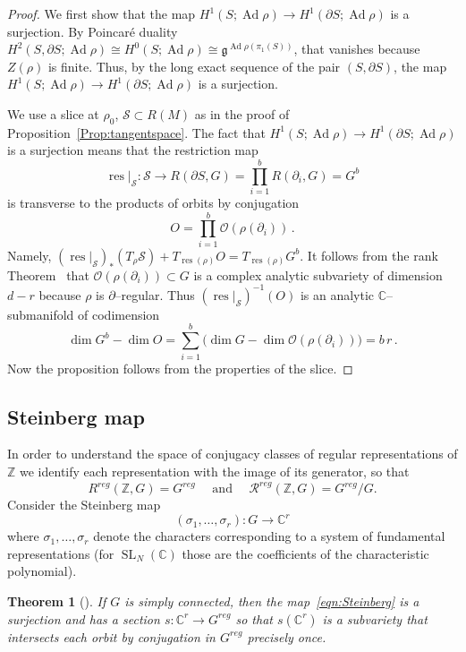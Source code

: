 \documentclass[11pt]{article}
\newtheorem{theo}{Theorem}[section]
\theoremstyle{definition}
\numberwithin{equation}{section}
\numberwithin{figure}{section}
\numberwithin{table}{section}
\DeclareMathOperator{\SL}{SL}
\DeclareMathOperator{\Ad}{Ad}
\DeclareMathOperator{\res}{res}
\newcommand{\Rcal}{\mathcal{R}}
\newcommand{\Ocal}{\mathcal{O}}
\newcommand{\Scal}{\mathcal{S}}
\newcommand{\Cbb}{\mathbb{C}}
\newcommand{\Zbb}{\mathbb{Z}}
\newcommand{\gfrk}{\mathfrak{g}}
\newcommand*\dG{{d}}
\newcommand*\rG{r}
\newcommand*\bS{b}
\begin{document}
\begin{proof}
We first show that the map $H^1(S;\Ad\rho)\to H^1(\partial S;\Ad\rho)$ is a surjection. By Poincaré duality $H^2(S,\partial S;\Ad\rho) \cong H^0(S;\Ad\rho)\cong \gfrk^{\Ad\rho(\pi_1(S))}$, that vanishes because $Z(\rho)$ is finite. Thus, by the long exact sequence of the pair $(S,\partial S)$, the map $H^1(S;\Ad\rho)\to H^1(\partial S;\Ad\rho)$ is a surjection.


We use a slice at $\rho_0$, $\Scal\subset R(M)$ as in the proof of Proposition~\ref{Prop:tangentspace}. The fact that $H^1(S;\Ad\rho)\to H^1(\partial S;\Ad\rho)$ is a surjection means that the restriction map
\[
\res\vert _\Scal\colon\Scal\to R(\partial S, G)=
\prod_{i=1}^\bS R(\partial_i, G)= G^\bS
\]
is transverse to the products of orbits by conjugation
\[
O=\prod_{i=1}^\bS\Ocal(\rho(\partial_i))\,.
\]
Namely, $(\res\vert_\Scal)_* (T_{\rho}\Scal)+ T_{\res(\rho)} O= T _{\res(\rho)} G^\bS$. It follows from the rank Theorem~\cite[Chapter~4.1]{Loj} that $\Ocal(\rho(\partial_i))\subset G$ is a complex analytic subvariety of dimension $\dG-\rG$ because $\rho$ is $\partial$--regular. Thus $(\res\vert_\Scal)^{-1}(O)$ is an analytic $\Cbb$--submanifold of codimension
\[
\dim G^\bS -\dim O = \sum_{i=1}^\bS \big(\dim G -\dim \Ocal(\rho(\partial_i))\big) =
\bS\, \rG\,.
\]
Now the proposition follows from the properties of the slice.
\end{proof}

\subsection{Steinberg map}\label{subsection:Steinberg}
In order to understand the space of conjugacy classes of regular representations of $\Zbb$ we identify each representation with the image of its generator, so that
\[
R^{reg}(\Zbb,G)= G^{reg}
\quad\text{ and }\quad
\Rcal^{reg}(\Zbb,G)= G^{reg}/G.
\]
Consider the Steinberg map
\begin{equation}\label{eqn:Steinberg}
(\sigma_1,\dots,\sigma_r) \colon G \to \Cbb^r
\end{equation}
where $\sigma_1,\dots,\sigma_r$ denote the characters corresponding to a system of fundamental representations (for $\SL_N (\Cbb)$ those are the coefficients of the characteristic polynomial).


\begin{theo}[\cite{SteinbergIHES}]\label{thm:Steinberg}
If $G$ is simply connected, then the map~\eqref{eqn:Steinberg} is a surjection and has a section $ s\colon \Cbb^r\to G^{reg}$ so that $s(\Cbb^r)$ is a subvariety that intersects each orbit by conjugation in $G^{reg}$ precisely once.
\end{theo}
\end{document}
